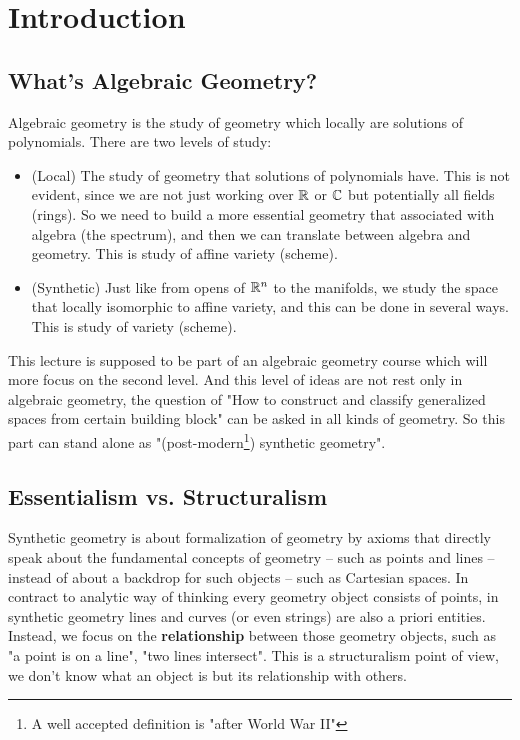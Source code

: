 \chapter{Introduction}\label{chap:introduction}


\section{What's Algebraic Geometry?}

Algebraic geometry is the study of geometry which locally are solutions of polynomials. There are two levels of study:

\begin{itemize}
  \item (Local) The study of geometry that solutions of polynomials have. This is not evident, since we are not just working over $\mathbb{R}$ or $\mathbb{C}$ but potentially all fields (rings). So we need to build a more essential geometry that associated with algebra (the spectrum), and then we can translate between algebra and geometry. This is study of affine variety (scheme).
  \item (Synthetic) Just like from opens of $\mathbb{R}^n$ to the manifolds, we study the space that locally isomorphic to affine variety, and this can be done in several ways. This is study of variety (scheme).
\end{itemize}

This lecture is supposed to be part of an algebraic geometry course which will more focus on the second level. And this level of ideas are not rest only in algebraic geometry, the question of "How to construct and classify generalized spaces from certain building block" can be asked in all kinds of geometry. So this part can stand alone as "(post-modern\footnote{A well accepted definition is "after World War II"}) synthetic geometry".

\section{Essentialism vs. Structuralism}
Synthetic geometry is about formalization of geometry by axioms that directly speak about the fundamental concepts of geometry – such as points and lines – instead of about a backdrop for such objects – such as Cartesian spaces. In contract to analytic way of thinking every geometry object consists of points, in synthetic geometry lines and curves (or even strings) are also a priori entities. Instead, we focus on the \textbf{relationship} between those geometry objects, such as "a point is on a line", "two lines intersect". This is a structuralism point of view, we don't know what an object is but its relationship with others.

